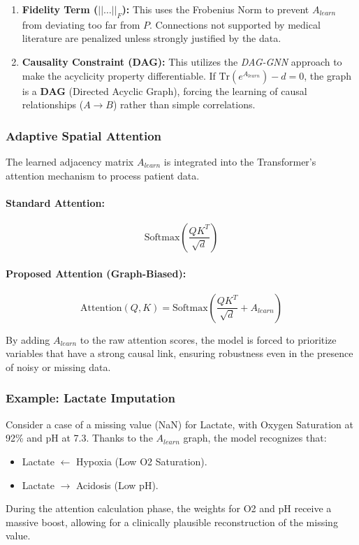 \begin{enumerate}
    \item \textbf{Fidelity Term ($||\dots||_F$):} This uses the Frobenius Norm to prevent $A_{learn}$ from deviating too far from $P$. Connections not supported by medical literature are penalized unless strongly justified by the data.
    \item \textbf{Causality Constraint (DAG):} This utilizes the \textit{DAG-GNN} approach to make the acyclicity property differentiable. If $\text{Tr}(e^{A_{learn}}) - d = 0$, the graph is a \textbf{DAG} (Directed Acyclic Graph), forcing the learning of causal relationships ($A \to B$) rather than simple correlations.
\end{enumerate}

\subsubsection{Adaptive Spatial Attention}

The learned adjacency matrix $A_{learn}$ is integrated into the Transformer's attention mechanism to process patient data.

\paragraph{Standard Attention:}
\begin{equation}
\text{Softmax}\left(\frac{Q K^T}{\sqrt{d}}\right)
\end{equation}

\paragraph{Proposed Attention (Graph-Biased):}
\begin{equation}
\text{Attention}(Q, K) = \text{Softmax}\left(\frac{Q K^T}{\sqrt{d}} + A_{learn}\right)
\end{equation}

By adding $A_{learn}$ to the raw attention scores, the model is forced to prioritize variables that have a strong causal link, ensuring robustness even in the presence of noisy or missing data.

\subsubsection{Example: Lactate Imputation}

Consider a case of a missing value (NaN) for Lactate, with Oxygen Saturation at 92\% and pH at 7.3. Thanks to the $A_{learn}$ graph, the model recognizes that:
\begin{itemize}
    \item Lactate $\leftarrow$ Hypoxia (Low O2 Saturation).
    \item Lactate $\to$ Acidosis (Low pH).
\end{itemize}
During the attention calculation phase, the weights for O2 and pH receive a massive boost, allowing for a clinically plausible reconstruction of the missing value.

